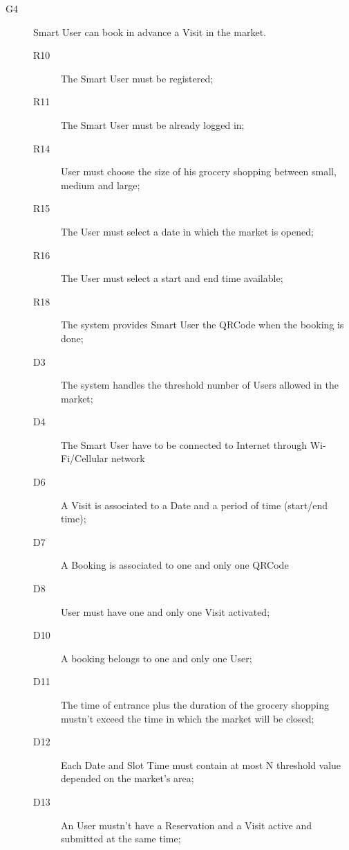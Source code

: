 \begin{description}
    \item[G4]Smart User can book in advance a Visit in the market.
    \begin{description}
    \item[R10] The Smart User must be registered;
    \item[R11] The Smart User must be already logged in;
    \item[R14] User must choose the size of his grocery shopping between small, medium and large;
    \item[R15] The User must select a date in which the market is opened;
    \item[R16] The User must select a start and end time available;
    \item[R18] The system provides Smart User the QRCode when the booking is done;
    \item[D3] The system handles the threshold number of Users allowed in the market;
    \item[D4] The Smart User have to be connected to Internet through Wi-Fi/Cellular network
    \item[D6] A Visit is associated to a Date and a period of time (start/end time);
    \item[D7] A Booking is associated to one and only one QRCode
    \item[D8] User must have one and only one Visit activated;
    \item[D10] A booking belongs to one and only one User;
    \item[D11] The time of entrance plus the duration of the grocery shopping mustn’t exceed the time in which the market will be closed; 
    \item[D12] Each Date and Slot Time must contain at most N threshold value depended on the market's area;
    \item[D13] An User mustn’t have a Reservation and a Visit active and submitted at the same time; 
    \end{description}
    

\end{description}
